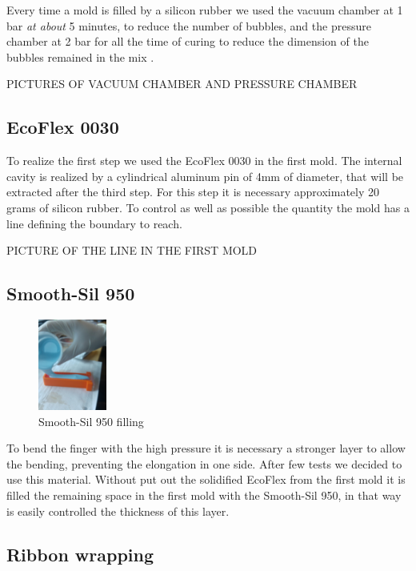 \documentclass{article}
\begin{document}
Every time a mold is filled by a silicon rubber we used the vacuum chamber at 1 bar \emph{at about} 5 minutes, to reduce the number of bubbles, and the pressure chamber at 2 bar for all the time of curing to reduce the dimension of the bubbles remained in the mix .

PICTURES OF VACUUM CHAMBER AND PRESSURE CHAMBER


\subsection{EcoFlex 0030}

To realize the first step we used the EcoFlex 0030 in the first mold. The internal cavity is realized by a cylindrical aluminum pin of 4mm of diameter, that will be extracted after the third step.
For this step it is necessary approximately 20 grams of silicon rubber. 
To control as well as possible the quantity the mold has a line defining the boundary to reach.

PICTURE OF THE LINE IN THE FIRST MOLD


\subsection{Smooth-Sil 950}

\begin{figure}
\centering
    \includegraphics[width=0.2\textwidth]{Pictures/fingerOnToroidal/SmoothSil950filling.jpg}
    \caption{Smooth-Sil 950 filling}
    \label{fig:SmoothSil950filling}
\end{figure}

To bend the finger with the high pressure it is necessary a stronger layer to allow the bending, preventing the elongation in one side.
After few tests we decided to use this material. Without put out the solidified EcoFlex from the first mold it is filled the remaining space in the first mold with the Smooth-Sil 950, in that way is easily controlled the thickness of this layer.


\subsection{Ribbon wrapping}
\end{document}
